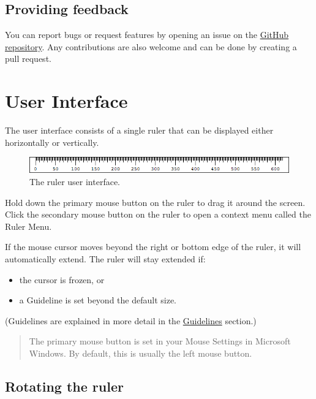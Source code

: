 \documentclass[
]{book}
\providecommand{\tightlist}{%
  \setlength{\itemsep}{0pt}\setlength{\parskip}{0pt}}
\begin{document}
\section{Providing feedback}\label{providing-feedback}

You can report bugs or request features by opening an issue on the \href{https://github.com/Cossey/ScreenPixelRuler2}{GitHub repository}.
Any contributions are also welcome and can be done by creating a pull request.

\chapter{User Interface}\label{ui}

The user interface consists of a single ruler that can be displayed either horizontally or vertically.

\begin{figure}
\centering
\includegraphics{images/ruler.png}
\caption{\label{fig:unnamed-chunk-1}The ruler user interface.}
\end{figure}

Hold down the primary mouse button on the ruler to drag it around the screen.
Click the secondary mouse button on the ruler to open a context menu called the Ruler Menu.

If the mouse cursor moves beyond the right or bottom edge of the ruler, it will automatically extend.
The ruler will stay extended if:

\begin{itemize}
\tightlist
\item
  the cursor is frozen, or
\item
  a Guideline is set beyond the default size.
\end{itemize}

(Guidelines are explained in more detail in the \hyperref[guidelines]{Guidelines} section.)

\begin{quote}
The primary mouse button is set in your Mouse Settings in Microsoft Windows.
By default, this is usually the left mouse button.
\end{quote}

\section{Rotating the ruler}\label{rotate}
\end{document}
